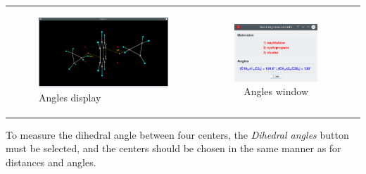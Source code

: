 \documentclass[10pt]{article}
\begin{document}
\begin{tabular}{lcr}
\begin{minipage}{.45\linewidth}
\begin{figure}[H]
\begin{center}
            \includegraphics[width=1\linewidth]{damqt320_angles_2.png}
        \end{center}
        \vspace*{1mm}
        \caption{Angles display \label{fig:4_2_6}}
    \end{figure}
\end{minipage}
&
\begin{minipage}{.25\linewidth}
    \begin{figure}[H]
        \begin{center}
            \vspace*{0mm}
            \includegraphics[width=0.8\linewidth]{damqt320_angles_3.png}
        \end{center}
        \vspace*{17mm}
        \caption{Angles window \label{fig:4_2_7}}
    \end{figure}
\end{minipage}
\end{tabular}

\vspace*{5mm}

To measure the dihedral angle between four centers,  
the {\it Dihedral angles} button must be selected,  
and the centers should be chosen in the same manner as for distances and angles.  
\end{document}
